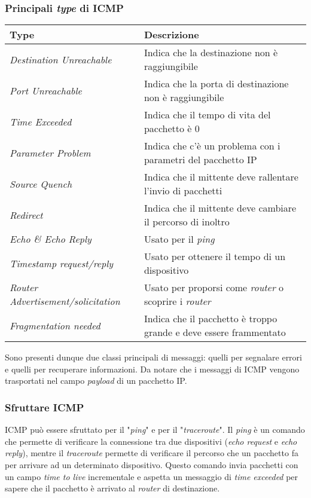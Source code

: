         \subsubsection{Principali \textit{type} di \Acrshort*{ICMP}}
            \begin{table}[H]
                \begin{tabular}{|p{}|p{}|}
                    \hline
                    \textbf{Type} & \textbf{Descrizione} \\ \hline
                    \textit{Destination Unreachable} & Indica che la destinazione non è raggiungibile \\ \hline
                    \textit{Port Unreachable} & Indica che la porta di destinazione non è raggiungibile \\ \hline
                    \textit{Time Exceeded} & Indica che il tempo di vita del pacchetto è 0 \\ \hline
                    \textit{Parameter Problem} & Indica che c'è un problema con i parametri del pacchetto \Acrshort*{IP} \\ \hline
                    \textit{Source Quench} & Indica che il mittente deve rallentare l'invio di pacchetti \\ \hline
                    \textit{Redirect} & Indica che il mittente deve cambiare il percorso di inoltro \\ \hline
                    \textit{Echo \& Echo Reply} & Usato per il \textit{ping} \\ \hline
                    \textit{Timestamp request/reply} & Usato per ottenere il tempo di un dispositivo \\ \hline
                    \textit{Router Advertisement/solicitation} & Usato per proporsi come \textit{router} o scoprire i \textit{router} \\ \hline
                    \textit{Fragmentation needed} & Indica che il pacchetto è troppo grande e deve essere frammentato \\ \hline
                \end{tabular}
            \end{table}
        Sono presenti dunque due classi principali di messaggi: quelli per segnalare errori e quelli per recuperare informazioni. Da notare che i messaggi di \Acrshort*{ICMP} vengono trasportati nel campo \textit{payload} di un pacchetto \Acrshort*{IP}.
        \subsubsection{Sfruttare \Acrshort*{ICMP}} \Acrshort*{ICMP} può essere sfruttato per il "\textit{ping}" e per il "\textit{traceroute}". Il \textit{ping} è un comando che permette di verificare la connessione tra due dispositivi (\textit{echo request} e \textit{echo reply}), mentre il \textit{traceroute} permette di verificare il percorso che un pacchetto fa per arrivare ad un determinato dispositivo. Questo comando invia pacchetti con un campo \textit{time to live} incrementale e aspetta un messaggio di \textit{time exceeded} per sapere che il pacchetto è arrivato al \textit{router} di destinazione.


